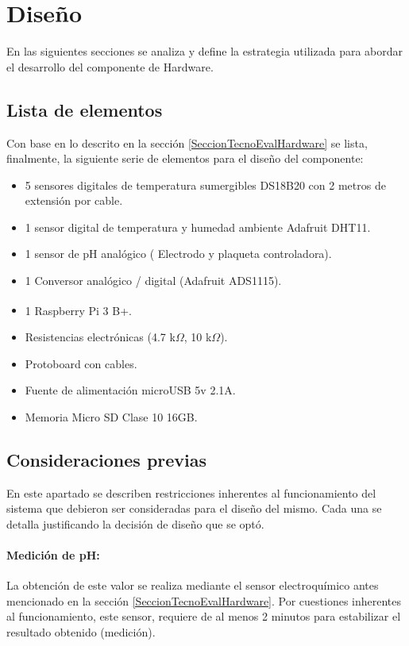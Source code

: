         
\section{Diseño}
    \par En las siguientes secciones se analiza y define la estrategia utilizada para abordar el desarrollo del componente de Hardware.
    
    \subsection{Lista de elementos}
    \label{subsectionListaElemHard}
    Con base en lo descrito en la sección \ref{SeccionTecnoEvalHardware} se lista, finalmente, la siguiente serie de elementos para el diseño del componente:
        \begin{itemize}
            \item 5 sensores digitales de temperatura sumergibles DS18B20 con 2 metros de extensión por cable.
            \item 1 sensor digital de temperatura y humedad ambiente Adafruit DHT11.
            \item 1 sensor de pH analógico ( Electrodo y plaqueta controladora).
            \item 1 Conversor analógico / digital (Adafruit ADS1115).
            \item 1 Raspberry\textsuperscript{\textregistered} Pi 3 B+.
            \item Resistencias electrónicas (4.7 k$\Omega$, 10 k$\Omega$).
            \item Protoboard con cables.
            \item Fuente de alimentación microUSB 5v 2.1A.
            \item Memoria Micro SD Clase 10 16GB.
        \end{itemize}
        
    \subsection{Consideraciones previas}
    \label{subseccionConsideracionesPreviasSensores}
        \par En este apartado se describen restricciones inherentes al funcionamiento del sistema que debieron ser consideradas para el diseño del mismo. Cada una se detalla justificando la decisión de diseño que se optó.
        
        \paragraph{Medición de pH:} 
            La obtención de este valor se realiza mediante el sensor electroquímico antes mencionado en la sección \ref{SeccionTecnoEvalHardware}. Por cuestiones inherentes al funcionamiento, este sensor, requiere de al menos 2 minutos para estabilizar el resultado obtenido (medición).


